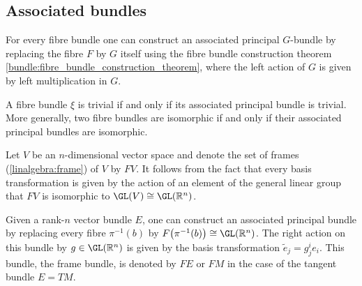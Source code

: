 
\subsection{Associated bundles}

    \begin{construct}\label{bundle:associated_bundle_construction}
        For every fibre bundle one can construct an associated principal $G$-bundle by replacing the fibre $F$ by $G$ itself using the fibre bundle construction theorem \ref{bundle:fibre_bundle_construction_theorem}, where the left action of $G$ is given by left multiplication in $G$.
    \end{construct}

    \begin{property}[Triviality]
        A fibre bundle $\xi$ is trivial if and only if its associated principal bundle is trivial. More generally, two fibre bundles are isomorphic if and only if their associated principal bundles are isomorphic.
    \end{property}

    \begin{example}\label{bundle:frame_bundle}
        Let $V$ be an $n$-dimensional vector space and denote the set of frames (\cref{linalgebra:frame}) of $V$ by $FV$. It follows from the fact that every basis transformation is given by the action of an element of the general linear group that $FV$ is isomorphic to $\GL(V)\cong\GL(\mathbb{R}^n)$.

        Given a rank-$n$ vector bundle $E$, one can construct an associated principal bundle by replacing every fibre $\pi^{-1}(b)$ by $F\bigl(\pi^{-1}(b)\bigr)\cong\GL(\mathbb{R}^n)$. The right action on this bundle by $g\in\GL(\mathbb{R}^n)$ is given by the basis transformation $\widetilde{e}_j=g^i_je_i$. This bundle, the frame bundle, is denoted by $FE$ or $FM$ in the case of the tangent bundle $E=TM$.
    \end{example}

